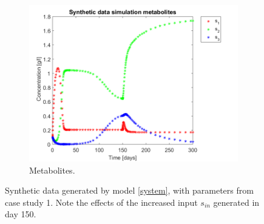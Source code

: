 \documentclass[3p,times]{article}
\begin{document}
\begin{figure}[h]
\begin{subfigure}{0.32 \linewidth}
	\includegraphics[width=\linewidth]{proof_of_concept/250309_POC_metabolites}
	\caption{Metabolites.}
	\label{PC_synthetic_metabolites}
	\end{subfigure}
	\caption{Synthetic data generated by model \eqref{system}, with parameters from case study 1. Note the effects of the increased input $s_{in}$ generated in day 150.}
	\label{synthetic_data}
\end{figure}





\end{document}

